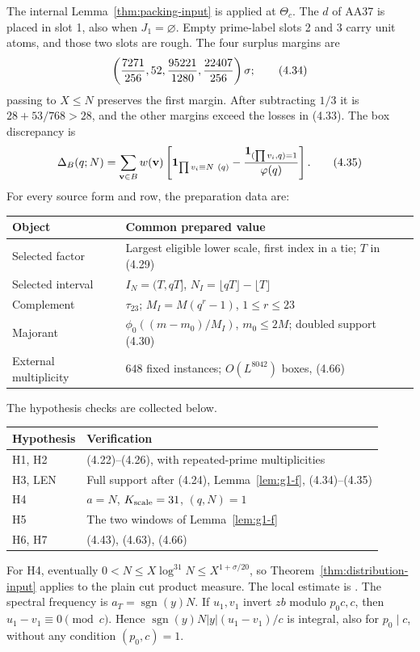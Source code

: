 The internal Lemma~\ref{thm:packing-input} is applied at $\Theta_c$.
The $d$ of AA37 is placed in slot 1, also when $J_1=\varnothing$.
Empty prime-label slots 2 and 3 carry unit atoms, and those two slots are rough.
The four surplus margins are
\[
 \left({7271\over256},52,{95221\over1280},{22407\over256}\right)\sigma;
 \tag{4.34}
\]
passing to $X\le N$ preserves the first margin.
After subtracting $1/3$ it is $28+53/768>28$, and the other margins exceed the losses in (4.33).
The box discrepancy is
\[
 \Delta_B(q;N)=\sum_{\mathbf v\in B}w(\mathbf v)
 \left[\mathbf1_{\prod v_i\equiv N\ (q)}
       -{\mathbf1_{(\prod v_i,q)=1}\over\varphi(q)}\right].
 \tag{4.35}
\]
For every source form and row, the preparation data are:
\begin{center}
\begin{tabular}{@{}lp{}@{}}
\toprule
Object & Common prepared value \\
\midrule
Selected factor & Largest eligible lower scale, first index in a tie; $T$ in (4.29) \\
Selected interval & $I_N=(T,qT]$, $N_I=\lfloor qT\rfloor-\lfloor T\rfloor$ \\
Complement & $\tau_{23}$; $M_I=M(q^r-1)$, $1\le r\le23$ \\
Majorant & $\phi_0((m-m_0)/M_I)$, $m_0\le2M$; doubled support (4.30) \\
External multiplicity & $648$ fixed instances; $O(L^{8042})$ boxes, (4.66) \\
\bottomrule
\end{tabular}
\end{center}
The hypothesis checks are collected below.
\begin{center}
\begin{tabular}{@{}ll@{}}
\toprule
Hypothesis & Verification \\
\midrule
H1, H2 & (4.22)--(4.26), with repeated-prime multiplicities \\
H3, LEN & Full support after (4.24), Lemma~\ref{lem:g1-f}, (4.34)--(4.35) \\
H4 & $a=N$, $K_{\rm scale}=31$, $(q,N)=1$ \\
H5 & The two windows of Lemma~\ref{lem:g1-f} \\
H6, H7 & (4.43), (4.63), (4.66) \\
\bottomrule
\end{tabular}
\end{center}
For H4, eventually $0<N\le X\log^{31}N\le X^{1+\sigma/20}$,
so Theorem~\ref{thm:distribution-input} applies to the plain cut product measure.
The local estimate is \cite[Theorem~3.2, (3.13)]{Z1}.
The spectral frequency is $a_T=\operatorname{sgn}(y)N$.
If $u_1,v_1$ invert $zb$ modulo $p_0c,c$, then $u_1-v_1\equiv0\pmod c$.
Hence $\operatorname{sgn}(y)N|y|(u_1-v_1)/c$ is integral, also for $p_0\mid c$, without any condition $(p_0,c)=1$.


